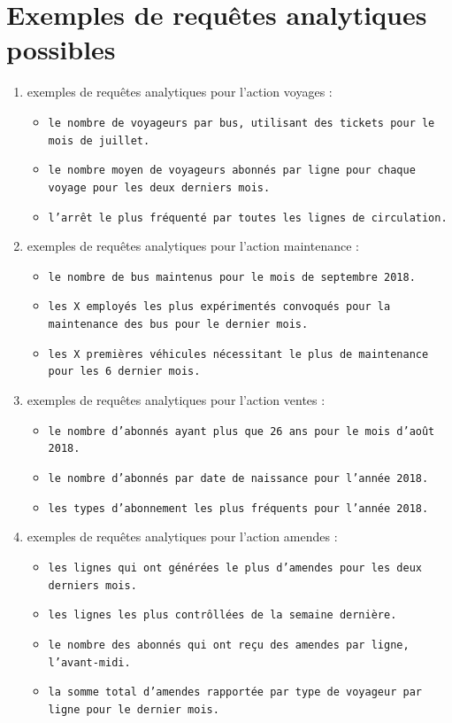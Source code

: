 \documentclass[a4paper,12pt]{report}
\begin{document}
\section{Exemples de requêtes analytiques possibles}
\begin{enumerate}
  \item exemples de requêtes analytiques pour l'action \og voyages \fg :
  \begin{itemize}
    \item \texttt{le nombre de voyageurs par bus, utilisant des tickets pour le mois de juillet.}
    \item \texttt{le nombre moyen de voyageurs abonnés par ligne pour chaque voyage pour les deux derniers mois.}
    \item \texttt{l'arrêt le plus fréquenté par toutes les lignes de circulation.}
  \end{itemize}
  \item exemples de requêtes analytiques pour l'action \og maintenance \fg :
  \begin{itemize}
    \item \texttt{le nombre de bus maintenus pour le mois de septembre 2018.}
    \item \texttt{les X employés les plus expérimentés convoqués pour la maintenance des bus pour le dernier mois.}
    \item \texttt{les X premières véhicules nécessitant le plus de maintenance pour les 6 dernier mois.}
  \end{itemize}
  \item exemples de requêtes analytiques pour l'action \og ventes \fg :
  \begin{itemize}
    \item \texttt{le nombre d'abonnés ayant plus que 26 ans pour le mois d'août 2018.}
    \item \texttt{le nombre d'abonnés par date de naissance pour l'année 2018.}
    \item \texttt{les types d'abonnement les plus fréquents pour l'année 2018.}
  \end{itemize}
  \item exemples de requêtes analytiques pour l'action \og amendes \fg :
  \begin{itemize}
    \item \texttt{les lignes qui ont générées le plus d'amendes pour les deux derniers mois.}
    \item \texttt{les lignes les plus contrôllées de la semaine dernière.}
    \item \texttt{le nombre des abonnés qui ont reçu des amendes par ligne, l'avant-midi.}
    \item \texttt{la somme total d'amendes rapportée par type de voyageur par ligne pour le dernier mois.}
  \end{itemize}
\end{enumerate}
\end{document}
